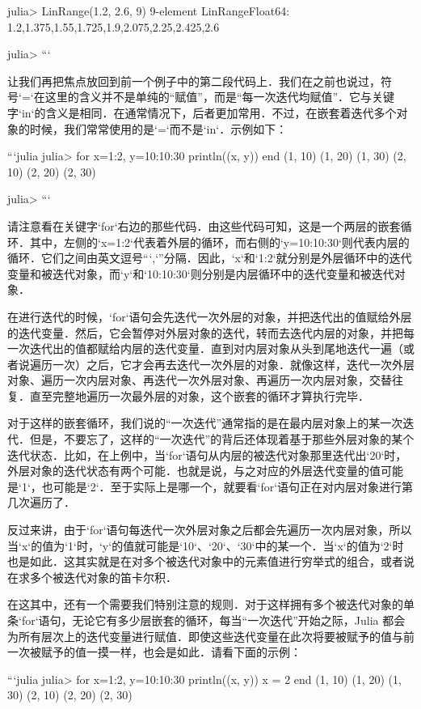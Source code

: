 julia> LinRange(1.2, 2.6, 9)
9-element LinRange{Float64}:
 1.2,1.375,1.55,1.725,1.9,2.075,2.25,2.425,2.6

julia> 
```

让我们再把焦点放回到前一个例子中的第二段代码上．我们在之前也说过，符号`=`在这里的含义并不是单纯的“赋值”，而是“每一次迭代均赋值”．它与关键字`in`的含义是相同．在通常情况下，后者更加常用．不过，在嵌套着迭代多个对象的时候，我们常常使用的是`=`而不是`in`．示例如下：

```julia
julia> for x=1:2, y=10:10:30
           println((x, y))
       end
(1, 10)
(1, 20)
(1, 30)
(2, 10)
(2, 20)
(2, 30)

julia>
```

请注意看在关键字`for`右边的那些代码．由这些代码可知，这是一个两层的嵌套循环．其中，左侧的`x=1:2`代表着外层的循环，而右侧的`y=10:10:30`则代表内层的循环．它们之间由英文逗号“`,`”分隔．因此，`x`和`1:2`就分别是外层循环中的迭代变量和被迭代对象，而`y`和`10:10:30`则分别是内层循环中的迭代变量和被迭代对象．

在进行迭代的时候，`for`语句会先迭代一次外层的对象，并把迭代出的值赋给外层的迭代变量．然后，它会暂停对外层对象的迭代，转而去迭代内层的对象，并把每一次迭代出的值都赋给内层的迭代变量．直到对内层对象从头到尾地迭代一遍（或者说遍历一次）之后，它才会再去迭代一次外层的对象．就像这样，迭代一次外层对象、遍历一次内层对象、再迭代一次外层对象、再遍历一次内层对象，交替往复．直至完整地遍历一次最外层的对象，这个嵌套的循环才算执行完毕．

对于这样的嵌套循环，我们说的“一次迭代”通常指的是在最内层对象上的某一次迭代．但是，不要忘了，这样的“一次迭代”的背后还体现着基于那些外层对象的某个迭代状态．比如，在上例中，当`for`语句从内层的被迭代对象那里迭代出`20`时，外层对象的迭代状态有两个可能．也就是说，与之对应的外层迭代变量的值可能是`1`，也可能是`2`．至于实际上是哪一个，就要看`for`语句正在对内层对象进行第几次遍历了．

反过来讲，由于`for`语句每迭代一次外层对象之后都会先遍历一次内层对象，所以当`x`的值为`1`时，`y`的值就可能是`10`、`20`、`30`中的某一个．当`x`的值为`2`时也是如此．这其实就是在对多个被迭代对象中的元素值进行穷举式的组合，或者说在求多个被迭代对象的笛卡尔积．

在这其中，还有一个需要我们特别注意的规则．对于这样拥有多个被迭代对象的单条`for`语句，无论它有多少层嵌套的循环，每当“一次迭代”开始之际，Julia 都会为所有层次上的迭代变量进行赋值．即使这些迭代变量在此次将要被赋予的值与前一次被赋予的值一摸一样，也会是如此．请看下面的示例：

```julia
julia> for x=1:2, y=10:10:30
           println((x, y))
           x = 2
       end
(1, 10)
(1, 20)
(1, 30)
(2, 10)
(2, 20)
(2, 30)

